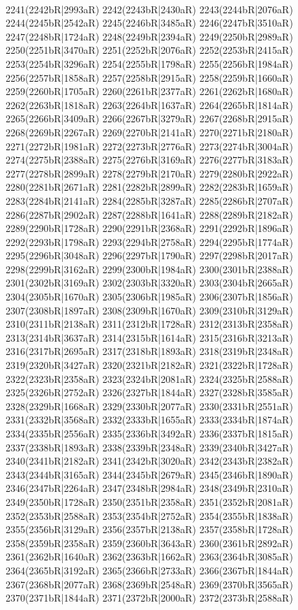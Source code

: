 \\2241(2242bR|2993aR) 2242(2243bR|2430aR) 2243(2244bR|2076aR) 2244(2245bR|2542aR) 2245(2246bR|3485aR) 2246(2247bR|3510aR) 2247(2248bR|1724aR) 2248(2249bR|2394aR) 2249(2250bR|2989aR) \\2250(2251bR|3470aR) 2251(2252bR|2076aR) 2252(2253bR|2415aR) 2253(2254bR|3296aR) 2254(2255bR|1798aR) 2255(2256bR|1984aR) 2256(2257bR|1858aR) 2257(2258bR|2915aR) 2258(2259bR|1660aR) \\2259(2260bR|1705aR) 2260(2261bR|2377aR) 2261(2262bR|1680aR) 2262(2263bR|1818aR) 2263(2264bR|1637aR) 2264(2265bR|1814aR) 2265(2266bR|3409aR) 2266(2267bR|3279aR) 2267(2268bR|2915aR) \\2268(2269bR|2267aR) 2269(2270bR|2141aR) 2270(2271bR|2180aR) 2271(2272bR|1981aR) 2272(2273bR|2776aR) 2273(2274bR|3004aR) 2274(2275bR|2388aR) 2275(2276bR|3169aR) 2276(2277bR|3183aR) \\2277(2278bR|2899aR) 2278(2279bR|2170aR) 2279(2280bR|2922aR) 2280(2281bR|2671aR) 2281(2282bR|2899aR) 2282(2283bR|1659aR) 2283(2284bR|2141aR) 2284(2285bR|3287aR) 2285(2286bR|2707aR) \\2286(2287bR|2902aR) 2287(2288bR|1641aR) 2288(2289bR|2182aR) 2289(2290bR|1728aR) 2290(2291bR|2368aR) 2291(2292bR|1896aR) 2292(2293bR|1798aR) 2293(2294bR|2758aR) 2294(2295bR|1774aR) \\2295(2296bR|3048aR) 2296(2297bR|1790aR) 2297(2298bR|2017aR) 2298(2299bR|3162aR) 2299(2300bR|1984aR) 2300(2301bR|2388aR) 2301(2302bR|3169aR) 2302(2303bR|3320aR) 2303(2304bR|2665aR) \\2304(2305bR|1670aR) 2305(2306bR|1985aR) 2306(2307bR|1856aR) 2307(2308bR|1897aR) 2308(2309bR|1670aR) 2309(2310bR|3129aR) 2310(2311bR|2138aR) 2311(2312bR|1728aR) 2312(2313bR|2358aR) \\2313(2314bR|3637aR) 2314(2315bR|1614aR) 2315(2316bR|3213aR) 2316(2317bR|2695aR) 2317(2318bR|1893aR) 2318(2319bR|2348aR) 2319(2320bR|3427aR) 2320(2321bR|2182aR) 2321(2322bR|1728aR) \\2322(2323bR|2358aR) 2323(2324bR|2081aR) 2324(2325bR|2588aR) 2325(2326bR|2752aR) 2326(2327bR|1844aR) 2327(2328bR|3585aR) 2328(2329bR|1668aR) 2329(2330bR|2077aR) 2330(2331bR|2551aR) \\2331(2332bR|3568aR) 2332(2333bR|1655aR) 2333(2334bR|1874aR) 2334(2335bR|2556aR) 2335(2336bR|3492aR) 2336(2337bR|1815aR) 2337(2338bR|1893aR) 2338(2339bR|2348aR) 2339(2340bR|3427aR) \\2340(2341bR|2182aR) 2341(2342bR|3020aR) 2342(2343bR|2382aR) 2343(2344bR|3165aR) 2344(2345bR|2679aR) 2345(2346bR|1890aR) 2346(2347bR|2264aR) 2347(2348bR|2984aR) 2348(2349bR|2310aR) \\2349(2350bR|1728aR) 2350(2351bR|2358aR) 2351(2352bR|2081aR) 2352(2353bR|2588aR) 2353(2354bR|2752aR) 2354(2355bR|1838aR) 2355(2356bR|3129aR) 2356(2357bR|2138aR) 2357(2358bR|1728aR) \\2358(2359bR|2358aR) 2359(2360bR|3643aR) 2360(2361bR|2892aR) 2361(2362bR|1640aR) 2362(2363bR|1662aR) 2363(2364bR|3085aR) 2364(2365bR|3192aR) 2365(2366bR|2733aR) 2366(2367bR|1844aR) \\2367(2368bR|2077aR) 2368(2369bR|2548aR) 2369(2370bR|3565aR) 2370(2371bR|1844aR) 2371(2372bR|2000aR) 2372(2373bR|2588aR) 